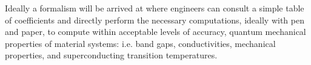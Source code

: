 
Ideally a formalism will be arrived at where engineers can consult a simple table of coefficients
and directly perform the necessary computations, ideally with pen and paper, to compute within acceptable
levels of accuracy, quantum mechanical properties of material systems: i.e. band gaps, 
conductivities, mechanical properties, and superconducting transition temperatures. 

